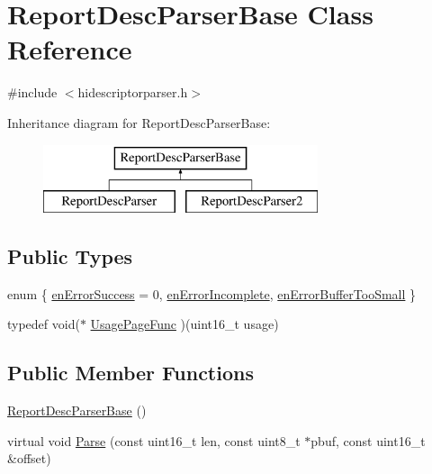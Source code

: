\hypertarget{class_report_desc_parser_base}{\section{\-Report\-Desc\-Parser\-Base \-Class \-Reference}
\label{class_report_desc_parser_base}
}


{\ttfamily \#include $<$hidescriptorparser.\-h$>$}

\-Inheritance diagram for \-Report\-Desc\-Parser\-Base\-:\begin{figure}[H]
\begin{center}
\leavevmode
\includegraphics[height=2.000000cm]{class_report_desc_parser_base}
\end{center}
\end{figure}
\subsection*{\-Public \-Types}
\begin{DoxyCompactItemize}
\item 
enum \{ \hyperlink{class_report_desc_parser_base_a5a8a67c612492e07c4656792b35c70d8ab24601408ad7a26379df557dab8f073a}{en\-Error\-Success} =  0, 
\hyperlink{class_report_desc_parser_base_a5a8a67c612492e07c4656792b35c70d8a36c789b01edcb0e3bd8fc74ad6450975}{en\-Error\-Incomplete}, 
\hyperlink{class_report_desc_parser_base_a5a8a67c612492e07c4656792b35c70d8af987a827c15a079e71ad438be18366d4}{en\-Error\-Buffer\-Too\-Small}
 \}
\item 
typedef void($\ast$ \hyperlink{class_report_desc_parser_base_aeb139df01922910be7558b3c3a893db2}{\-Usage\-Page\-Func} )(uint16\-\_\-t usage)
\end{DoxyCompactItemize}
\subsection*{\-Public \-Member \-Functions}
\begin{DoxyCompactItemize}
\item 
\hyperlink{class_report_desc_parser_base_a607a81ff9d8f282298533a1dbf10f8e1}{\-Report\-Desc\-Parser\-Base} ()
\item 
virtual void \hyperlink{class_report_desc_parser_base_a7ecd266cbbbc18460ab8823651225e6b}{\-Parse} (const uint16\-\_\-t len, const uint8\-\_\-t $\ast$pbuf, const uint16\-\_\-t \&offset)
\end{DoxyCompactItemize}
